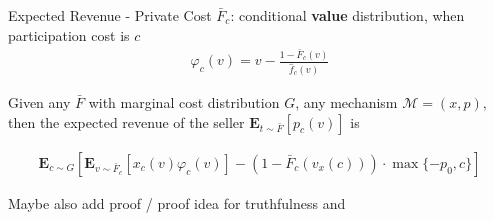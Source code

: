 \documentclass{beamer}
\begin{document}
\begin{frame}{Expected Revenue - Private Cost}
  $\bar{F}_c$: conditional \textbf{value} distribution, when participation cost is $c$
  \begin{align*}
    \varphi_c(v) = v - \frac{1- \bar{F}_c(v)}{\hat{f}_c(v)}
  \end{align*}

  \begin{theorem}
    Given any $\bar{F}$ with marginal cost distribution $G$, any mechanism $\mathcal{M}=(x,p)$, then the expected revenue of the seller $\mathbf{E}_{t \sim \bar{F}}\left[p_c(v)\right] $ is

    \begin{align*}
      \mathbf{E}_{c \sim G}\left[\mathbf{E}_{v\sim\bar{F}_c}\left[x_c(v)\varphi_c(v)\right] - (1-\bar{F}_c(v_x(c))) \cdot \max\{-p_0,c\}\right]
    \end{align*}
  \end{theorem}

  Maybe also add proof / proof idea for truthfulness and
\end{frame}
\end{document}
